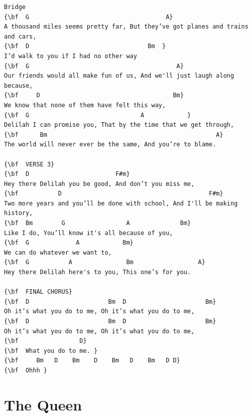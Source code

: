 \documentclass[a4paper]{article}
\begin{document}
\begin{Verbatim}[commandchars=\\\{\}]
Bridge
{\bf  G                                      A}
A thousand miles seems pretty far, But they’ve got planes and trains and cars, 
{\bf  D                                 Bm  }
I’d walk to you if I had no other way 
{\bf  G                                         A}
Our friends would all make fun of us, And we'll just laugh along because, 
{\bf     D                                     Bm}
We know that none of them have felt this way, 
{\bf  G                               A            }
Delilah I can promise you, That by the time that we get through, 
{\bf      Bm                                               A}
The world will never ever be the same, And you’re to blame. 

{\bf  VERSE 3}
{\bf  D                        F#m}
Hey there Delilah you be good, And don’t you miss me, 
{\bf           D                                         F#m}
Two more years and you’ll be done with school, And I'll be making history, 
{\bf  Bm        G                 A              Bm}
Like I do, You’ll know it's all because of you, 
{\bf  G             A            Bm}
We can do whatever we want to, 
{\bf  G           A               Bm                  A}
Hey there Delilah here's to you, This one’s for you. 

{\bf  FINAL CHORUS}
{\bf  D                      Bm  D                      Bm}
Oh it’s what you do to me, Oh it’s what you do to me, 
{\bf  D                      Bm  D                      Bm}
Oh it’s what you do to me, Oh it’s what you do to me, 
{\bf                 D}
{\bf  What you do to me. }
{\bf     Bm   D    Bm    D    Bm   D    Bm   D D}
{\bf  Ohhh }

\end{Verbatim}
\newpage
\section{The Queen}
\end{document}
